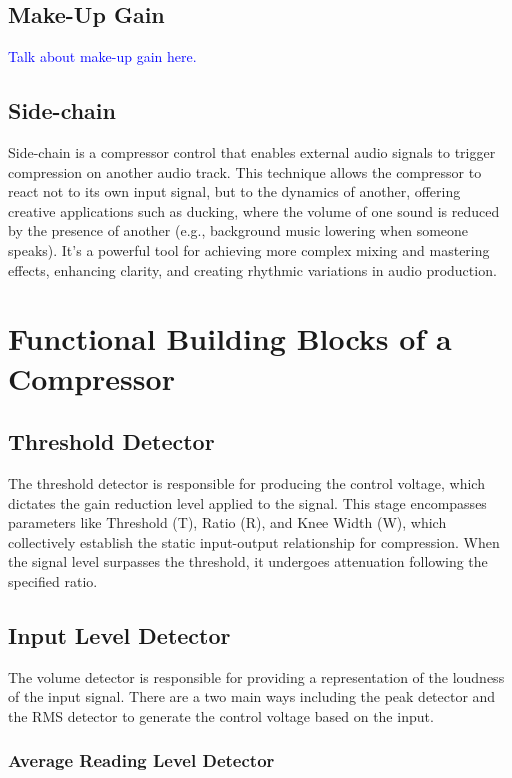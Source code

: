 \documentclass[10pt]{article}
\begin{document}
\begin{multicols*}{2}
            \subsection{Make-Up Gain}
                \textcolor{blue}{Talk about make-up gain here.}

            \subsection{Side-chain}
                Side-chain is a compressor control that enables external audio signals to trigger compression on another audio track. This technique allows the compressor to react not to its own input signal, but to the dynamics of another, offering creative applications such as ducking, where the volume of one sound is reduced by the presence of another (e.g., background music lowering when someone speaks). It's a powerful tool for achieving more complex mixing and mastering effects, enhancing clarity, and creating rhythmic variations in audio production.

        \section{Functional Building Blocks of a Compressor}

            \subsection{Threshold Detector}
                The threshold detector is responsible for producing the control voltage, which dictates the gain reduction level applied to the signal. This stage encompasses parameters like Threshold (T), Ratio (R), and Knee Width (W), which collectively establish the static input-output relationship for compression. When the signal level surpasses the threshold, it undergoes attenuation following the specified ratio.
            
            \subsection{Input Level Detector}
                The volume detector is responsible for providing a representation of the loudness of the input signal. There are a two main ways including the peak detector and the RMS detector to generate the control voltage based on the input.

                \subsubsection{Average Reading Level Detector}
                

\end{multicols*}
\end{document}
